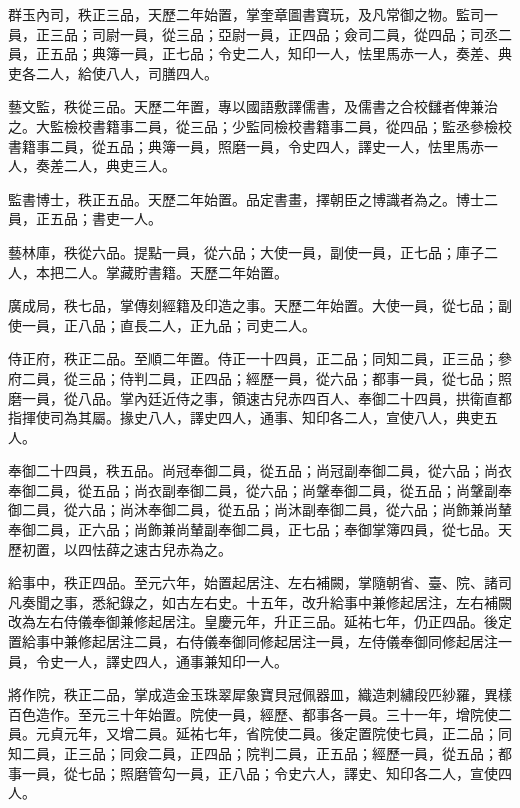 \begin{pinyinscope}
 群玉內司，秩正三品，天歷二年始置，掌奎章圖書寶玩，及凡常御之物。監司一員，正三品；司尉一員，從三品；亞尉一員，正四品；僉司二員，從四品；司丞二員，正五品；典簿一員，正七品；令史二人，知印一人，怯里馬赤一人，奏差、典吏各二人，給使八人，司膳四人。



 藝文監，秩從三品。天歷二年置，專以國語敷譯儒書，及儒書之合校讎者俾兼治之。大監檢校書籍事二員，從三品；少監同檢校書籍事二員，從四品；監丞參檢校書籍事二員，從五品；典簿一員，照磨一員，令史四人，譯史一人，怯里馬赤一人，奏差二人，典吏三人。



 監書博士，秩正五品。天歷二年始置。品定書畫，擇朝臣之博識者為之。博士二員，正五品；書吏一人。



 藝林庫，秩從六品。提點一員，從六品；大使一員，副使一員，正七品；庫子二人，本把二人。掌藏貯書籍。天歷二年始置。



 廣成局，秩七品，掌傳刻經籍及印造之事。天歷二年始置。大使一員，從七品；副使一員，正八品；直長二人，正九品；司吏二人。



 侍正府，秩正二品。至順二年置。侍正一十四員，正二品；同知二員，正三品；參府二員，從三品；侍判二員，正四品；經歷一員，從六品；都事一員，從七品；照磨一員，從八品。掌內廷近侍之事，領速古兒赤四百人、奉御二十四員，拱衛直都指揮使司為其屬。掾史八人，譯史四人，通事、知印各二人，宣使八人，典吏五人。



 奉御二十四員，秩五品。尚冠奉御二員，從五品；尚冠副奉御二員，從六品；尚衣奉御二員，從五品；尚衣副奉御二員，從六品；尚鞶奉御二員，從五品；尚鞶副奉御二員，從六品；尚沐奉御二員，從五品；尚沐副奉御二員，從六品；尚飾兼尚輦奉御二員，正六品；尚飾兼尚輦副奉御二員，正七品；奉御掌簿四員，從七品。天歷初置，以四怯薛之速古兒赤為之。



 給事中，秩正四品。至元六年，始置起居注、左右補闕，掌隨朝省、臺、院、諸司凡奏聞之事，悉紀錄之，如古左右史。十五年，改升給事中兼修起居注，左右補闕改為左右侍儀奉御兼修起居注。皇慶元年，升正三品。延祐七年，仍正四品。後定置給事中兼修起居注二員，右侍儀奉御同修起居注一員，左侍儀奉御同修起居注一員，令史一人，譯史四人，通事兼知印一人。



 將作院，秩正二品，掌成造金玉珠翠犀象寶貝冠佩器皿，織造刺繡段匹紗羅，異樣百色造作。至元三十年始置。院使一員，經歷、都事各一員。三十一年，增院使二員。元貞元年，又增二員。延祐七年，省院使二員。後定置院使七員，正二品；同知二員，正三品；同僉二員，正四品；院判二員，正五品；經歷一員，從五品；都事一員，從七品；照磨管勾一員，正八品；令史六人，譯史、知印各二人，宣使四人。




\end{pinyinscope}
